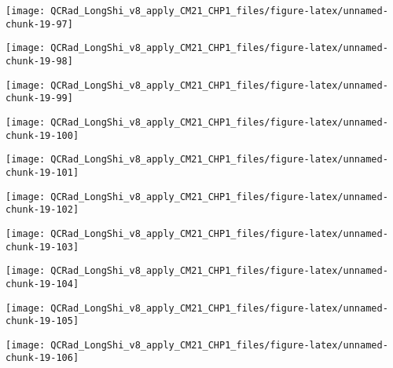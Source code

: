 \documentclass[
  10pt,
  a4paper,oneside]{article}
\begin{document}
\begin{center}\texttt{[image: QCRad\_LongShi\_v8\_apply\_CM21\_CHP1\_files/figure-latex/unnamed-chunk-19-97]} \end{center}

\begin{center}\texttt{[image: QCRad\_LongShi\_v8\_apply\_CM21\_CHP1\_files/figure-latex/unnamed-chunk-19-98]} \end{center}

\begin{center}\texttt{[image: QCRad\_LongShi\_v8\_apply\_CM21\_CHP1\_files/figure-latex/unnamed-chunk-19-99]} \end{center}

\begin{center}\texttt{[image: QCRad\_LongShi\_v8\_apply\_CM21\_CHP1\_files/figure-latex/unnamed-chunk-19-100]} \end{center}

\begin{center}\texttt{[image: QCRad\_LongShi\_v8\_apply\_CM21\_CHP1\_files/figure-latex/unnamed-chunk-19-101]} \end{center}

\begin{center}\texttt{[image: QCRad\_LongShi\_v8\_apply\_CM21\_CHP1\_files/figure-latex/unnamed-chunk-19-102]} \end{center}

\begin{center}\texttt{[image: QCRad\_LongShi\_v8\_apply\_CM21\_CHP1\_files/figure-latex/unnamed-chunk-19-103]} \end{center}

\begin{center}\texttt{[image: QCRad\_LongShi\_v8\_apply\_CM21\_CHP1\_files/figure-latex/unnamed-chunk-19-104]} \end{center}

\begin{center}\texttt{[image: QCRad\_LongShi\_v8\_apply\_CM21\_CHP1\_files/figure-latex/unnamed-chunk-19-105]} \end{center}

\begin{center}\texttt{[image: QCRad\_LongShi\_v8\_apply\_CM21\_CHP1\_files/figure-latex/unnamed-chunk-19-106]} \end{center}
\end{document}
